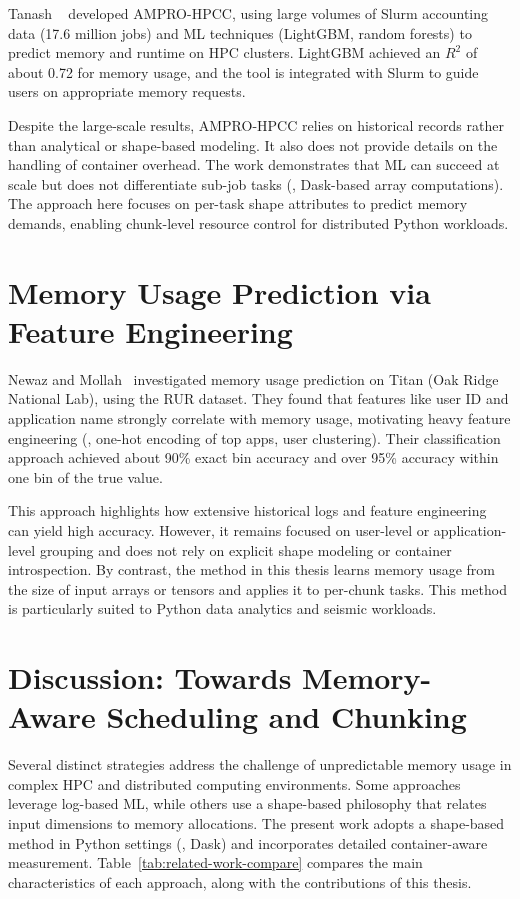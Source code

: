 Tanash \etal~\cite{tanash2021ampro} developed AMPRO-HPCC, using large volumes of Slurm accounting data (17.6 million jobs) and \ac{ML} techniques (LightGBM, random forests) to predict memory and runtime on \ac{HPC} clusters.
LightGBM achieved an $R^2$ of about 0.72 for memory usage, and the tool is integrated with Slurm to guide users on appropriate memory requests.

Despite the large-scale results, AMPRO-HPCC relies on historical records rather than analytical or shape-based modeling.
It also does not provide details on the handling of container overhead.
The work demonstrates that \ac{ML} can succeed at scale but does not differentiate sub-job tasks (\eg, Dask-based array computations).
The approach here focuses on per-task shape attributes to predict memory demands, enabling chunk-level resource control for distributed Python workloads.


\section{Memory Usage Prediction via Feature Engineering}
\label{sec:rw-feature-engineering}

Newaz and Mollah~\cite{newaz2023} investigated memory usage prediction on Titan (Oak Ridge National Lab), using the \ac{RUR} dataset.
They found that features like user ID and application name strongly correlate with memory usage, motivating heavy feature engineering (\eg, one-hot encoding of top apps, user clustering).
Their classification approach achieved about 90\% exact bin accuracy and over 95\% accuracy within one bin of the true value.

This approach highlights how extensive historical logs and feature engineering can yield high accuracy.
However, it remains focused on user-level or application-level grouping and does not rely on explicit shape modeling or container introspection.
By contrast, the method in this thesis learns memory usage from the size of input arrays or tensors and applies it to per-chunk tasks. This method is particularly suited to Python data analytics and seismic workloads.


\section{Discussion: Towards Memory-Aware Scheduling and Chunking}
\label{sec:rw-discussion}

Several distinct strategies address the challenge of unpredictable memory usage in complex \ac{HPC} and distributed computing environments.
Some approaches leverage log-based \ac{ML}, while others use a shape-based philosophy that relates input dimensions to memory allocations.
The present work adopts a shape-based method in Python settings (\eg, Dask) and incorporates detailed container-aware measurement.
Table~\ref{tab:related-work-compare} compares the main characteristics of each approach, along with the contributions of this thesis.

